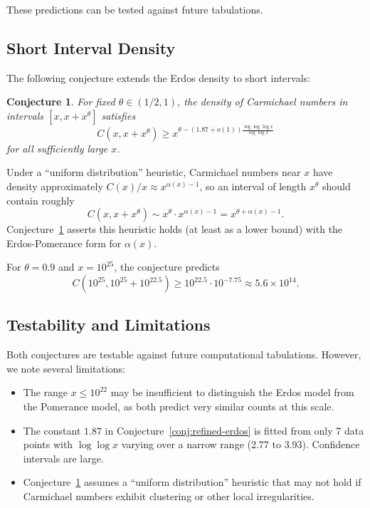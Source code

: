 \documentclass{amsart}
\theoremstyle{plain}
\newtheorem{conjecture}[theorem]{Conjecture}
\theoremstyle{definition}
\theoremstyle{remark}
\begin{document}
These predictions can be tested against future tabulations.

\subsection{Short Interval Density}

The following conjecture extends the Erdos density to short intervals:

\begin{conjecture}\label{conj:short-interval}
For fixed $\theta \in (1/2, 1)$, the density of Carmichael numbers in intervals $[x, x + x^\theta]$ satisfies
\[
C(x, x + x^\theta) \ge x^{\theta - (1.87 + o(1)) \frac{\log \log \log x}{\log \log x}}
\]
for all sufficiently large $x$.
\end{conjecture}

Under a ``uniform distribution'' heuristic, Carmichael numbers near $x$ have density approximately $C(x)/x \approx x^{\alpha(x) - 1}$, so an interval of length $x^\theta$ should contain roughly
\[
C(x, x + x^\theta) \sim x^\theta \cdot x^{\alpha(x) - 1} = x^{\theta + \alpha(x) - 1}.
\]
Conjecture~\ref{conj:short-interval} asserts this heuristic holds (at least as a lower bound) with the Erdos-Pomerance form for $\alpha(x)$.

For $\theta = 0.9$ and $x = 10^{25}$, the conjecture predicts
\[
C(10^{25}, 10^{25} + 10^{22.5}) \ge 10^{22.5} \cdot 10^{-7.75} \approx 5.6 \times 10^{14}.
\]

\subsection{Testability and Limitations}

Both conjectures are testable against future computational tabulations. However, we note several limitations:
\begin{itemize}
\item The range $x \le 10^{22}$ may be insufficient to distinguish the Erdos model from the Pomerance model, as both predict very similar counts at this scale.
\item The constant $1.87$ in Conjecture~\ref{conj:refined-erdos} is fitted from only 7 data points with $\log \log x$ varying over a narrow range (2.77 to 3.93). Confidence intervals are large.
\item Conjecture~\ref{conj:short-interval} assumes a ``uniform distribution'' heuristic that may not hold if Carmichael numbers exhibit clustering or other local irregularities.
\end{itemize}
\end{document}
